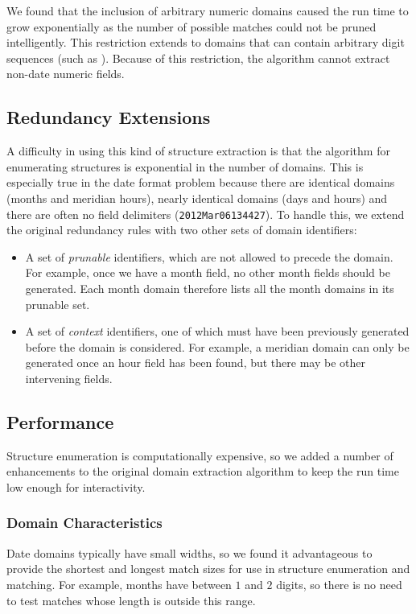 We found that the inclusion of arbitrary numeric domains caused the run time to grow exponentially as the number of possible matches could not be pruned intelligently. 
This restriction extends to domains that can contain arbitrary digit sequences (such as ). Because of this restriction, the algorithm cannot extract non-date numeric fields.

\subsection{Redundancy Extensions} \label{subsec:mdl:redundancy}
A difficulty in using this kind of structure extraction is that the algorithm for enumerating structures is exponential in the number of domains. This is especially true in the date format problem because there are identical domains (\eg months and meridian hours), nearly identical domains (\eg days and hours) and there are often no field delimiters (\eg \texttt{2012Mar06134427}). To handle this, we extend the original redundancy rules with two other sets of domain identifiers:
\begin{itemize}
\setlength\itemsep{0em}
\item A set of \textit{prunable} identifiers, which are not allowed to precede the domain. For example, once we have a month field, no other month fields should be generated. Each month domain therefore lists all the month domains in its prunable set.
\item A set of \textit{context} identifiers, one of which must have been previously generated before the domain is considered. For example, a meridian domain can only be generated once an hour field has been found, but there may be other intervening fields.
\end{itemize}

\subsection{Performance}
Structure enumeration is computationally expensive, so we added a number of enhancements to the original domain extraction algorithm to keep the run time low enough for interactivity.

\subsubsection{Domain Characteristics}
Date domains typically have small widths, so we found it advantageous to provide the shortest and longest match sizes for use in structure enumeration and matching. For example, months have between $1$ and $2$ digits, so there is no need to test matches whose length is outside this range.

